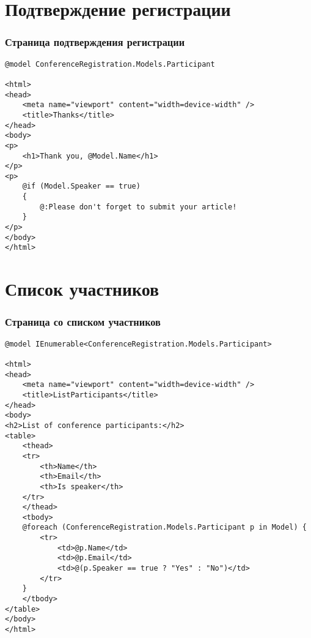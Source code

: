 \documentclass[xetex,mathserif,serif]{beamer}
\begin{document}
    \section{Подтверждение регистрации}

    \begin{frame}[fragile]
        \frametitle{Страница подтверждения регистрации}
        \begin{scriptsize}
            \begin{verbatim}
@model ConferenceRegistration.Models.Participant

<html>
<head>
    <meta name="viewport" content="width=device-width" />
    <title>Thanks</title>
</head>
<body>
<p>
    <h1>Thank you, @Model.Name</h1>
</p>
<p>
    @if (Model.Speaker == true)
    {
        @:Please don't forget to submit your article!
    }
</p>
</body>
</html>
            \end{verbatim}
        \end{scriptsize}
    \end{frame}

    \section{Список участников}

    \begin{frame}[fragile]
        \frametitle{Страница со списком участников}
        \begin{ssmall}
            \begin{verbatim}
@model IEnumerable<ConferenceRegistration.Models.Participant>

<html>
<head>
    <meta name="viewport" content="width=device-width" />
    <title>ListParticipants</title>
</head>
<body>
<h2>List of conference participants:</h2>
<table>
    <thead>
    <tr>
        <th>Name</th>
        <th>Email</th>
        <th>Is speaker</th>
    </tr>
    </thead>
    <tbody>
    @foreach (ConferenceRegistration.Models.Participant p in Model) {
        <tr>
            <td>@p.Name</td>
            <td>@p.Email</td>
            <td>@(p.Speaker == true ? "Yes" : "No")</td>
        </tr>
    }
    </tbody>
</table>
</body>
</html>
            \end{verbatim}
        \end{ssmall}
    \end{frame}
\end{document}

